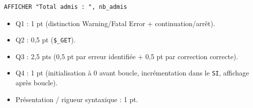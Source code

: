 \documentclass[11pt]{article}
\begin{document}
\begin{corrige}
\begin{lstlisting}[language={}]
AFFICHER "Total admis : ", nb_admis
\end{lstlisting}

\begin{aretenir}
\begin{itemize}
    \item Q1 : 1 pt (distinction Warning/Fatal Error + continuation/arrêt).
    \item Q2 : 0,5 pt (\texttt{\$\_GET}).
    \item Q3 : 2,5 pts (0,5 pt par erreur identifiée + 0,5 pt par correction correcte).
    \item Q4 : 1 pt (initialisation à 0 avant boucle, incrémentation dans le \texttt{SI}, affichage après boucle).
    \item Présentation / rigueur syntaxique : 1 pt.
\end{itemize}
\end{aretenir}
\end{corrige}
\end{document}
